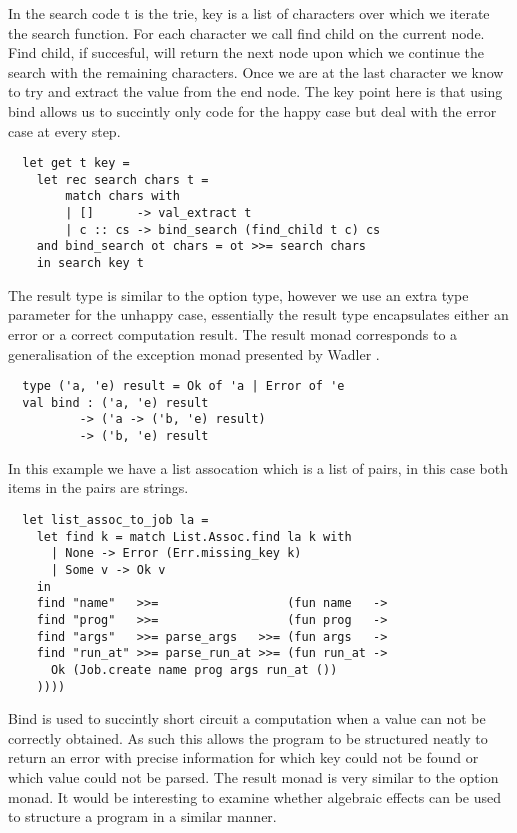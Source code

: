 \documentclass[a4paper,10pt]{article}
\theoremstyle{definition}
\begin{document}

In the search code t is the trie, key is a list of characters over which
we iterate the search function. For each character we call find child on
the current node. Find child, if succesful, will return the next node
upon which we continue the search with the remaining characters. Once we
are at the last character we know to try and extract the value from the end
node. The key point here is that using bind allows us to succintly only code
for the happy case but deal with the error case at every step.

\begin{verbatim}
  let get t key =
    let rec search chars t =
        match chars with
        | []      -> val_extract t
        | c :: cs -> bind_search (find_child t c) cs
    and bind_search ot chars = ot >>= search chars
    in search key t
\end{verbatim}

The result type is similar to the option type, however we use an extra type
parameter for the unhappy case, essentially the result type encapsulates 
either an error or a correct computation result. The result monad
corresponds to a generalisation of the exception monad presented by Wadler \cite{wadler1995monads}.

\begin{verbatim}
  type ('a, 'e) result = Ok of 'a | Error of 'e
  val bind : ('a, 'e) result
          -> ('a -> ('b, 'e) result)
          -> ('b, 'e) result
\end{verbatim}

In this example we have a list assocation which is a list of pairs, in this case both
items in the pairs are strings.

\begin{verbatim}
  let list_assoc_to_job la =
    let find k = match List.Assoc.find la k with
      | None -> Error (Err.missing_key k)
      | Some v -> Ok v
    in
    find "name"   >>=                  (fun name   ->
    find "prog"   >>=                  (fun prog   ->
    find "args"   >>= parse_args   >>= (fun args   ->
    find "run_at" >>= parse_run_at >>= (fun run_at ->
      Ok (Job.create name prog args run_at ())
    ))))
\end{verbatim}

Bind is used to succintly short circuit a computation when a value can not be
correctly obtained. As such this allows the program to be structured neatly to return
an error with precise information for which key could not be found or which value could
not be parsed. The result monad is very similar to the option monad. It would be interesting
to examine whether algebraic effects can be used to structure a program in a similar manner.
\end{document}
